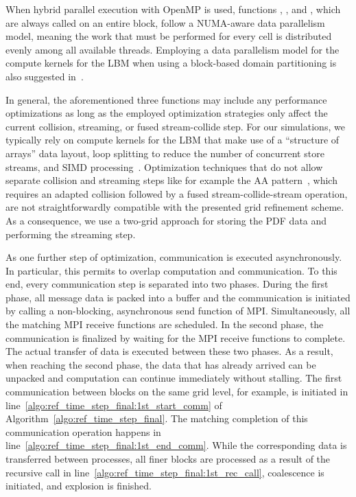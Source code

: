 \documentclass[final,leqno,onefignum,onetabnum]{siamltex1213}
\begin{document}
When hybrid parallel execution with OpenMP is used, functions , , and ,
which are always called on an entire block, follow a NUMA-aware data parallelism model,
meaning the work that must be performed for every cell
is distributed evenly among all available threads.
Employing a data parallelism model for the compute kernels for the LBM
when using a block-based domain partitioning is also suggested in~\cite{heuveline2009,krause2010}.

In general, the aforementioned three functions may include any performance optimizations as long as
the employed optimization strategies only affect the current collision, streaming, or fused stream-collide step.
For our simulations, we typically rely on compute kernels for the LBM that make use of a ``structure of arrays'' data layout,
loop splitting to reduce the number of concurrent store streams, and SIMD processing~\cite{CPE:CPE3180}.
Optimization techniques that do not allow separate collision and streaming steps like for example the AA pattern~\cite{5362489},
which requires an adapted collision followed by a fused stream-collide-stream operation,
are not straightforwardly compatible with the presented grid refinement scheme.
As a consequence, we use a two-grid approach for storing the PDF data and performing the streaming step.

As one further step of optimization, communication is executed asynchronously.
In particular, this permits to overlap computation and communication.
To this end, every communication step is separated into two phases.
During the first phase, all message data is packed into a buffer and
the communication is initiated by calling a non-blocking, asynchronous send function of MPI.
Simultaneously, all the matching MPI receive functions are scheduled.
In the second phase, the communication is finalized by waiting for the MPI receive functions to complete.
The actual transfer of data is executed between these two phases.
As a result, when reaching the second phase, the data that has already arrived can be unpacked and computation can continue immediately without stalling.
The first communication between blocks on the same grid level, for example, is initiated in line~\ref{algo:ref_time_step_final:1st_start_comm} of Algorithm~\ref{algo:ref_time_step_final}.
The matching completion of this communication operation happens in line~\ref{algo:ref_time_step_final:1st_end_comm}.
While the corresponding data is transferred between processes, all finer blocks are processed as a result of the recursive call in line~\ref{algo:ref_time_step_final:1st_rec_call},
coalescence is initiated, and explosion is finished.
\end{document}
